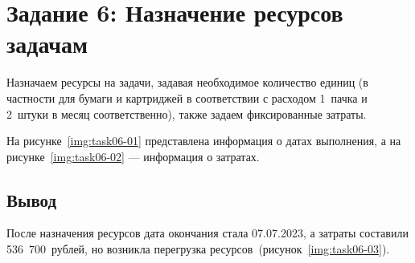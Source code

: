 \section{Задание 6: Назначение ресурсов задачам}

Назначаем ресурсы на задачи, задавая необходимое количество единиц (в частности
для бумаги и картриджей в соответствии с расходом 1~пачка и 2~штуки в месяц
соответственно), также задаем фиксированные затраты.

На рисунке~\ref{img:task06-01} представлена информация о датах выполнения, а на
рисунке~\ref{img:task06-02} --- информация о затратах.



\subsection*{Вывод}

После назначения ресурсов дата окончания стала 07.07.2023, а затраты составили
536~700~рублей, но возникла перегрузка ресурсов~(рисунок~\ref{img:task06-03}).

